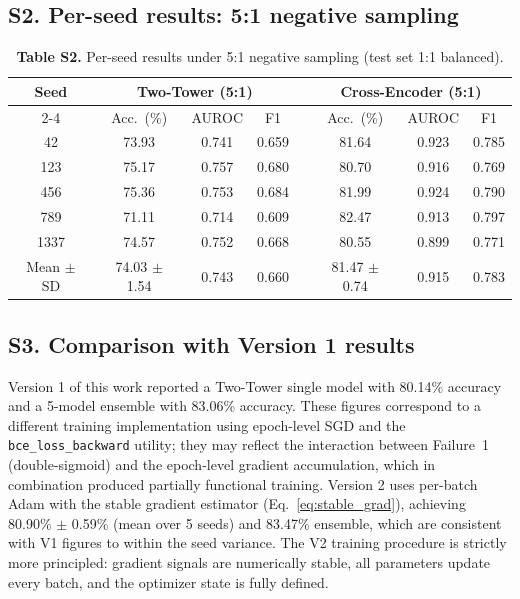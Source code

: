 \documentclass[10pt,twocolumn]{article}
\begin{document}
\subsection*{S2. Per-seed results: 5:1 negative sampling}

\begin{table}[H]
\centering
\caption*{\textbf{Table S2.} Per-seed results under 5:1 negative sampling (test set 1:1 balanced).}
\small
\begin{tabular}{@{}cccccccc@{}}
\toprule
\multirow{2}{*}{\textbf{Seed}} &
\multicolumn{3}{c}{\textbf{Two-Tower (5:1)}} & &
\multicolumn{3}{c}{\textbf{Cross-Encoder (5:1)}} \\
\cmidrule{2-4} \cmidrule{6-8}
 & Acc.\ (\%) & AUROC & F1 & & Acc.\ (\%) & AUROC & F1 \\
\midrule
42   & 73.93 & 0.741 & 0.659 & & 81.64 & 0.923 & 0.785 \\
123  & 75.17 & 0.757 & 0.680 & & 80.70 & 0.916 & 0.769 \\
456  & 75.36 & 0.753 & 0.684 & & 81.99 & 0.924 & 0.790 \\
789  & 71.11 & 0.714 & 0.609 & & 82.47 & 0.913 & 0.797 \\
1337 & 74.57 & 0.752 & 0.668 & & 80.55 & 0.899 & 0.771 \\
\midrule
Mean $\pm$ SD
     & 74.03 $\pm$ 1.54 & 0.743 & 0.660
     & & 81.47 $\pm$ 0.74 & 0.915 & 0.783 \\
\bottomrule
\end{tabular}
\end{table}

\subsection*{S3. Comparison with Version 1 results}

Version 1 of this work reported a Two-Tower single model with 80.14\% accuracy
and a 5-model ensemble with 83.06\% accuracy.
These figures correspond to a different training implementation using epoch-level
SGD and the \texttt{bce\_loss\_backward} utility; they may reflect the
interaction between Failure~1 (double-sigmoid) and the epoch-level gradient
accumulation, which in combination produced partially functional training.
Version 2 uses per-batch Adam with the stable gradient estimator (Eq.~\ref{eq:stable_grad}),
achieving 80.90\% $\pm$ 0.59\% (mean over 5 seeds) and 83.47\% ensemble,
which are consistent with V1 figures to within the seed variance.
The V2 training procedure is strictly more principled: gradient signals are
numerically stable, all parameters update every batch, and the optimizer state
is fully defined.
\end{document}
